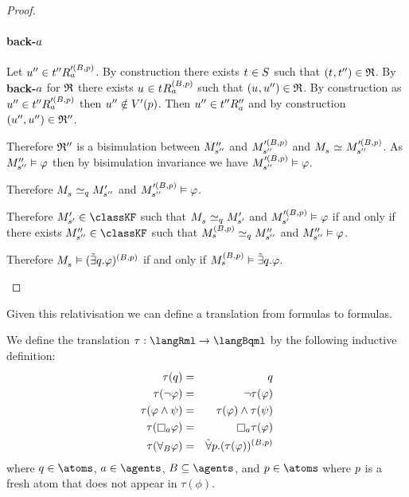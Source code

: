\begin{proof}
\begin{description}
        \paragraph{back-$\agentA$}
        Let $\kStateUPP \in \kSuccessorsA[\prime(\agentsB, \atomP)]{\kStateTPP}$.
        By construction there exists $\kStateT \in \kStates$ such that $(\kStateT, \kStateTPP) \in \bisimulation$.
        By {\bf back-$\agentA$} for $\bisimulation$ there exists $\kStateU \in \kSuccessorsA[(\agentsB, \atomP)]{\kStateT}$ such that $(\kStateU, \kStateUPP) \in \bisimulation$.
        By construction as $\kStateUPP \in \kSuccessorsA[\prime(\agentsB, \atomP)]{\kStateTPP}$ then $\kStateUPP \notin \kValuationP(\atomP)$.
        Then $\kStateUPP \in \kSuccessorsPPA{\kStateTPP}$ and by construction $(\kStateUPP, \kStateUPP) \in \bisimulation''$.

        Therefore $\bisimulation''$ is a bisimulation between $\kPModelPP{\kStateSPP}$ and $\kPModel[\prime(\agentsB, \atomP)]{\kStateSPP}$ and $\kPModel{\kStateS} \bisimilar \kPModel[\prime(\agentsB, \atomP)]{\kStateSPP}$.
        As $\kPModelPP{\kStateSPP} \entails \phi$ then by bisimulation invariance we have $\kPModel[\prime(\agentsB, \atomP)]{\kStateSPP} \entails \phi$.

        Therefore $\kPModel{\kStateS} \bisimilar[\atomQ] \kPModelP{\kStateSPP}$ and $\kPModel[\prime(\agentsB, \atomP)]{\kStateSPP} \entails \phi$.

        Therefore $\kPModelP{\kStateSP} \in \classKF$ such that $\kPModel{\kStateS} \bisimilar[\atomQ] \kPModelP{\kStateSP}$ and $\kPModel[\prime(\agentsB, \atomP)]{\kStateSP} \entails \phi$ if and only if there exists $\kPModelPP{\kStateSPP} \in \classKF$ such that $\kPModel[(\agentsB, \atomP)]{\kStateS} \bisimilar[\atomQ] \kPModelPP{\kStateSPP}$ and $\kPModelPP{\kStateSPP} \entails \phi$.

        Therefore $\kPModel{\kStateS} \entails (\somebisimsQ \phi)^{(\agentsB, \atomP)}$ if and only if $\kPModel[(\agentsB, \atomP)]{\kStateS} \entails \somebisimsQ \phi$.
\end{description}
\end{proof}

Given this relativisation we can define a translation from \langRml{} formulas to \langBqml{} formulas.

\begin{definition}
We define the translation $\tau : \langRml \to \langBqml$ by the following inductive definition:
\begin{eqnarray*}
    \tau(\atomQ) &=& \atomQ\\
    \tau(\lnot \phi) &=& \lnot \tau(\phi)\\
    \tau(\phi \land \psi) &=& \tau(\phi) \land \tau(\psi)\\
    \tau(\necessaryA \phi) &=& \necessaryA \tau(\phi)\\
    \tau(\allrefsBs \phi) &=& \allbisimsP (\tau(\phi))^{(\agentsB, \atomP)}
\end{eqnarray*}
where $\atomQ \in \atoms$, $\agentA \in \agents$, $\agentsB \subseteq \agents$, and $\atomP \in \atoms$ where $\atomP$ is a fresh atom that does not appear in $\tau(\phi)$.
\end{definition}

